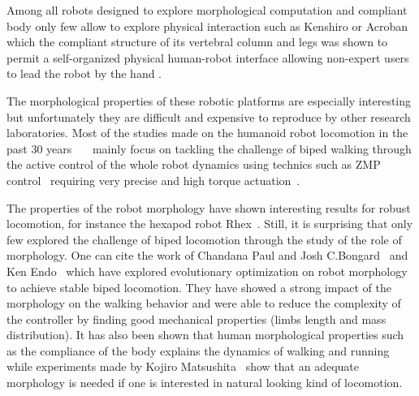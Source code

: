 Among all robots designed to explore morphological computation and compliant body only few allow to explore physical interaction such as Kenshiro \cite{Asano2012} or Acroban which the compliant structure of its vertebral column and legs was shown to permit a self-organized physical human-robot interface allowing non-expert users to lead the robot by the hand \cite{Ly2011bio}\cite{Oudeyer2011}.

The morphological properties of these robotic platforms are especially interesting but unfortunately they are difficult and expensive to reproduce by other research laboratories.
Most of the studies made on the humanoid robot locomotion in the past 30 years~\cite{park1998biped}~\cite{aoi2005locomotion}~\cite{park1998biped} mainly focus on tackling the challenge of biped walking through the active control of the whole robot dynamics using technics such as ZMP control~\cite{vukobratovic2004zero} requiring very precise and high torque actuation~\cite{akachi2005development}.

The properties of the robot morphology have shown interesting results for robust locomotion, for instance the hexapod robot Rhex~\cite{saranli2001rhex}. Still, it is surprising that only few explored the challenge of biped locomotion through the study of the role of morphology.
One can cite the work of Chandana Paul and Josh C.Bongard~\cite{paul2001road} and Ken Endo~\cite{endo2002co} which have explored evolutionary optimization on robot morphology to achieve stable biped locomotion. They have showed a strong impact of the morphology on the walking behavior and were able to reduce the complexity of the controller by finding good mechanical properties (limbs length and mass distribution). It has also been shown that human morphological properties such as the compliance of the body explains the dynamics of walking and running \cite{Geyer2006} while experiments made by Kojiro Matsushita~\cite{matsushita2005locomoting} show that an adequate morphology is needed if one is interested in natural looking kind of locomotion.



